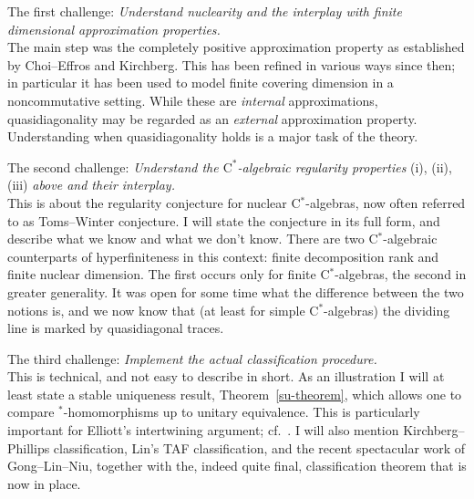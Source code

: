 \documentclass{amsart}
\begin{document}
\noindent
The first challenge: \emph{Understand nuclearity and the interplay with finite dimensional approximation properties.}\\ 
The main step was the completely positive approximation property as established by Choi--Effros and Kirchberg. This has been refined in various ways since then; in particular it has been used to model finite covering dimension in a noncommutative setting. While these are \emph{internal} approximations, quasidiagonality may be regarded as an \emph{external} approximation property. Understanding when quasidiagonality holds is a major task of the theory. 



\noindent
The second challenge: \emph{Understand the $\mathrm{C}^*$-algebraic regularity properties} (i), (ii), (iii)  \emph{above and their interplay.} \\
This is about the regularity conjecture for nuclear C$^*$-algebras, now often referred to as Toms--Winter conjecture. I will state the conjecture in its full form, and describe what we know and what we don't know. There are two C$^*$-algebraic counterparts of hyperfiniteness in this context: finite decomposition rank and finite nuclear dimension. The first occurs only for finite C$^*$-algebras, the second in greater generality. It was open for some time what the difference between the two notions is, and we now know that (at least for simple C$^*$-algebras) the dividing line is marked by quasidiagonal traces.

\noindent
The third challenge: \emph{Implement the actual classification procedure.} \\
This is technical, and not easy to describe in short. As an illustration I will at least state a stable uniqueness result, Theorem~\ref{su-theorem}, which allows one to compare $^*$-homomorphisms up to unitary equivalence. This is particularly important for Elliott's intertwining argument; cf.\ \cite{Ell:intertwining-in-tuxedo}. I will also mention Kirchberg--Phillips classification,  Lin's TAF classification, and the recent spectacular work of Gong--Lin--Niu, together with the, indeed quite final, classification theorem that is now in place. 
\end{document}
